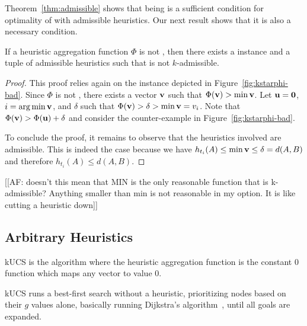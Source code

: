 Theorem~\ref{thm:admissible} shows that being \axiomadm is a sufficient condition for optimality of \kastarphi with admissible heuristics.
Our next result shows that it is also a necessary condition.

\begin{theorem}
	\label{thm:admissible-dual}
	If a heuristic aggregation function $\Phi$ is not \axiomadm, then there exists a \kgs instance and a tuple of admissible heuristics such that \kastarphi is not $k$-admissible.
\end{theorem}
\begin{proof}
	This proof relies again on the \kgs instance depicted in Figure~\ref{fig:kstarphi-bad}. Since $\Phi$ is not \axiomadm, there exists a vector $\mathbf{v}$ such that $\Phi(\mathbf{v}) > \min \mathbf{v}$. 
	Let $\mathbf{u} = \mathbf{0}$, $i = \operatorname*{arg\,min} \mathbf{v}$, and $\delta$ such that $\Phi(\mathbf{v}) > \delta > \min \mathbf{v} = v_i$.
	Note that $\Phi(\mathbf{v}) > \Phi(\mathbf{u}) + \delta$ and consider the counter-example in Figure~\ref{fig:kstarphi-bad}.
	
	To conclude the proof, it remains to observe that the heuristics involved are admissible.
	This is indeed the case because we have $h_{t_i}(A) \leq \min \mathbf{v} \leq \delta = d(A, B)$ and therefore $h_{t_i}(A) \leq d(A, B)$.
\end{proof}

[[AF: doesn't this mean that MIN is the only reasonable function that is k-admissible? Anything smaller than min is not reasonable in my option. It is like cutting a heuristic down]]


\subsection{Arbitrary Heuristics}

\begin{definition}
  \label{def:ucs}
  \ac{kUCS} is the  algorithm where the heuristic aggregation function is the constant 0 function which maps any vector to value 0.
\end{definition}
\ac{kUCS} runs a best-first search without a heuristic, prioritizing nodes based on their $g$ values alone, basically running Dijkstra's algorithm~\cite{DIJ59,Felner2011}, until all goals are expanded.  %

